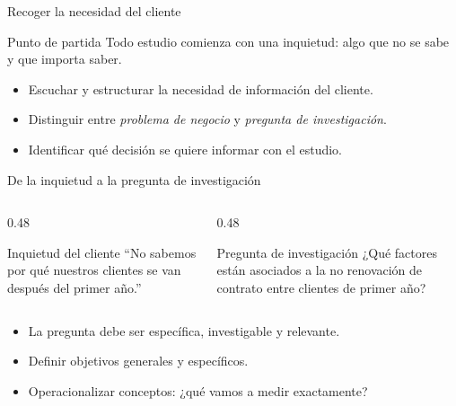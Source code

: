 \documentclass[aspectratio=169, 12pt]{beamer}
\begin{document}
\begin{frame}{Recoger la necesidad del cliente}
  \begin{block}{Punto de partida}
    Todo estudio comienza con una \alert{inquietud}: algo que no se sabe y que importa saber.
  \end{block}
  \vspace{0.4cm}
  \begin{itemize}
    \item Escuchar y estructurar la necesidad de información del cliente.
    \item Distinguir entre \textit{problema de negocio} y \textit{pregunta de investigación}.
    \item Identificar qué decisión se quiere informar con el estudio.
  \end{itemize}
\end{frame}

\begin{frame}{De la inquietud a la pregunta de investigación}
  \begin{columns}[T]
    \begin{column}{0.48\textwidth}
      \begin{block}{Inquietud del cliente}
        \small``No sabemos por qué nuestros clientes se van después del primer año.''
      \end{block}
    \end{column}
    \begin{column}{0.48\textwidth}
      \begin{block}{Pregunta de investigación}
        \small¿Qué factores están asociados a la no renovación de contrato entre clientes de primer año?
      \end{block}
    \end{column}
  \end{columns}
  \vspace{0.5cm}
  \begin{itemize}
    \item La pregunta debe ser \alert{específica}, \alert{investigable} y \alert{relevante}.
    \item Definir objetivos generales y específicos.
    \item Operacionalizar conceptos: ¿qué vamos a medir exactamente?
  \end{itemize}
\end{frame}
\end{document}
